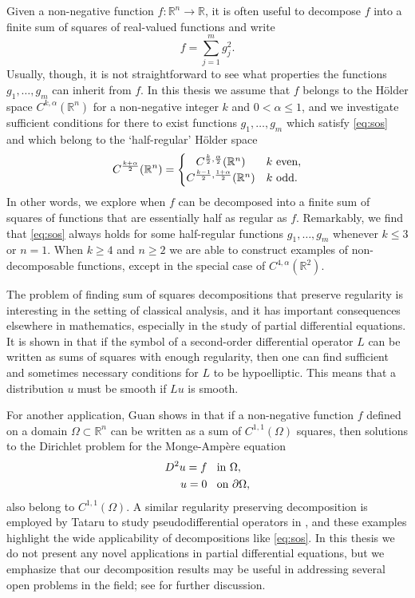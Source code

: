 \documentclass[oneside,hidelinks,indentfirst,10pt]{book}
\begin{document}
Given a non-negative function \(f:\mathbb{R}^n\rightarrow\mathbb{R}\), it is often useful to decompose \(f\) into a finite sum of squares of real-valued functions and write
\begin{equation}\label{eq:sos}
    f=\sum_{j=1}^m g_j^2.
\end{equation}
Usually, though, it is not straightforward to see what properties the functions \(g_1,\dots,g_m\) can inherit from \(f\). In this thesis we assume that \(f\) belongs to the H\"older space \(C^{k,\alpha}(\mathbb{R}^n)\) for a non-negative integer \(k\) and \(0<\alpha\leq 1\), and we investigate sufficient conditions for there to exist functions \(g_1,\dots,g_m\) which satisfy \eqref{eq:sos} and which belong to the `half-regular' H\"older space
\[
    C^\frac{k+\alpha}{2}(\mathbb{R}^n)=\begin{cases}\hfil C^{\frac{k}{2},\frac{\alpha}{2}}(\mathbb{R}^n) & k\textrm{ even}, \\ C^{\frac{k-1}{2},\frac{1+\alpha}{2}}(\mathbb{R}^n) & k\textrm{ odd}.
    \end{cases}
\]
In other words, we explore when \(f\) can be decomposed into a finite sum of squares of functions that are essentially half as regular as \(f\). Remarkably, we find that \eqref{eq:sos} always holds for some half-regular functions \(g_1,\dots,g_m\) whenever \(k\leq 3\) or \(n=1\). When \(k\geq 4\) and \(n\geq 2\) we are able to construct examples of non-decomposable functions, except in the special case of \(C^{4,\alpha}(\mathbb{R}^2)\).


The problem of finding sum of squares decompositions that preserve regularity is interesting in the setting of classical analysis, and it has important consequences elsewhere in mathematics, especially in the study of partial differential equations. It is shown in \cite{SOS_III} that if the symbol of a second-order differential operator \(L\) can be written as sums of squares with enough regularity, then one can find sufficient and sometimes necessary conditions for \(L\) to be hypoelliptic. This means that a distribution \(u\) must be smooth if \(Lu\) is smooth. 


For another application, Guan shows in \cite{Guan} that if a non-negative function \(f\) defined on a domain \(\Omega\subset\mathbb{R}^n\) can be written as a sum of \(C^{1,1}(\Omega)\) squares, then solutions to the Dirichlet problem for the Monge-Amp\`ere equation
\begin{align*}
    D^2u=f & \;\;\textrm{ in }\Omega,\\
    \hfil u=0 & \;\;\textrm{ on }\partial\Omega,
\end{align*}
also belong to \(C^{1,1}(\Omega)\). A similar regularity preserving decomposition is employed by Tataru to study pseudodifferential operators in \cite{Tataru}, and these examples highlight the wide applicability of decompositions like \eqref{eq:sos}. In this thesis we do not present any novel applications in partial differential equations, but we emphasize that our decomposition results may be useful in addressing several open problems in the field; see  for further discussion.
\end{document}
